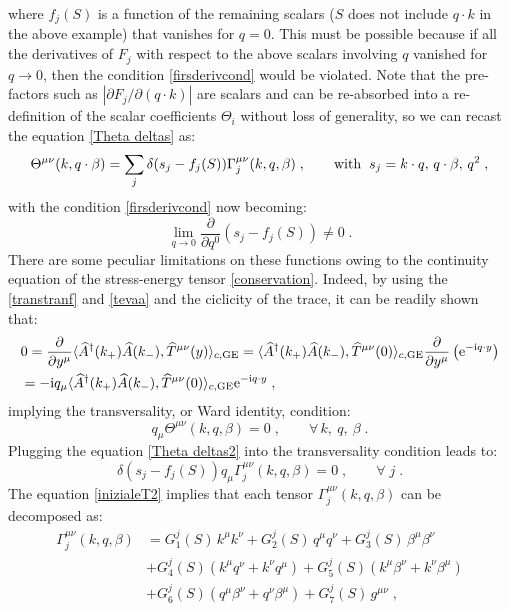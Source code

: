 \documentclass[prd,superscriptaddress,nofootinbib,notitlepage]{revtex4-1}
\def\wT{{\widehat T}}
\def\wA{{\widehat A}}
\def\wA{\widehat A}
\def\wAd{\widehat A^{\dagger}}
\newcommand{\e}{{\rm e}}
\newcommand{\ii}{{\rm i}}
\begin{document}
%
where $f_j(S)$ is a function of the remaining scalars ($S$ does not include $q\cdot k$ in the above example) 
that vanishes for $q=0$. This must be possible because if all the derivatives of $F_j$ with respect to the above scalars 
involving $q$ vanished for $q \to 0$, then the condition \eqref{firsderivcond} would be violated. Note that the pre-factors 
such as $|\partial F_j/\partial (q\cdot k)|$ are scalars and can be re-absorbed into a re-definition of the scalar coefficients 
$\Theta_i$ without loss of generality, so we can recast the equation \eqref{Theta deltas} as:
%
\begin{equation}\label{Theta deltas2}
     \Theta^{\mu\nu}(k,q\cdot\beta)=\sum_{j}\delta(s_j-f_j(S))\Gamma^{\mu\nu}_{j}(k,q,\beta)\;,  \qquad {\rm with}\;\; 
     s_j=k\cdot q,\, q\cdot\beta,\, q^2\;,
\end{equation}
% 
with the condition \eqref{firsderivcond} now becoming:
%
$$
   \lim_{q \to 0} \frac{\partial}{\partial q^0} \left( s_j - f_j(S) \right) \ne 0\;.
$$
%
There are some peculiar limitations on these functions owing to the continuity equation of the stress-energy 
tensor \eqref{conservation}. Indeed, by using the \eqref{transtranf} and \eqref{tevaa} and the ciclicity of the trace, 
it can be readily shown that:
%
\begin{align*}
& 0=\frac{\partial}{\partial y^\mu}\langle\wAd(k_+)\wA(k_-),\wT^{\mu\nu}(y)\rangle_{c,{\rm GE}}
=\langle\wAd(k_+)\wA(k_-),\wT^{\mu\nu}(0)\rangle_{c,{\rm GE}}\frac{\partial}{\partial y^\mu}
\left(\e^{-\ii q\cdot y}\right) \\
& =-\ii q_\mu\langle\wAd(k_+)\wA(k_-),\wT^{\mu\nu}(0)\rangle_{c,{\rm GE}}
\e^{-\ii q\cdot y}\;,
\end{align*}
%
implying the transversality, or Ward identity, condition:
%
\begin{equation}\label{qTheta=0}
   q_\mu\Theta^{\mu\nu}\left(k,q,\beta\right)=0\;, \qquad \forall \, k,\ q,\ \beta \; .
\end{equation}
%
Plugging the equation \eqref{Theta deltas2} into the transversality condition leads to:
%
\begin{equation}\label{ward gamma}
     \delta(s_j-f_j(S))q_\mu\Gamma^{\mu\nu}_{j}(k,q,\beta)=0\;,\qquad\forall\; j\;.
\end{equation}
% 
The equation \eqref{inizialeT2} implies that each tensor $\Gamma^{\mu\nu}_j(k,q,\beta)$ can be 
decomposed as:
%
\begin{equation}\label{iniziale2}
    \begin{split}
        \Gamma^{\mu\nu}_{j}(k,q,\beta)
        &=G^{j}_1(S)\,k^\mu k^\nu+G^{j}_2(S)\,q^\mu q^\nu
        + G^{j}_3(S)\,\beta^\mu \beta^\nu \\
        &+G^{j}_4(S)\left(k^\mu q^\nu + k^\nu q^\mu\right)
        +  G^{j}_5(S)\left(k^\mu \beta^\nu + k^\nu \beta^\mu\right) \\
        &+ G^{j}_6(S)\left(q^\mu \beta^\nu + q^\nu \beta^\mu\right)+  
        G^{j}_7(S)\,g^{\mu\nu}\;,
    \end{split}
\end{equation}
\end{document}
